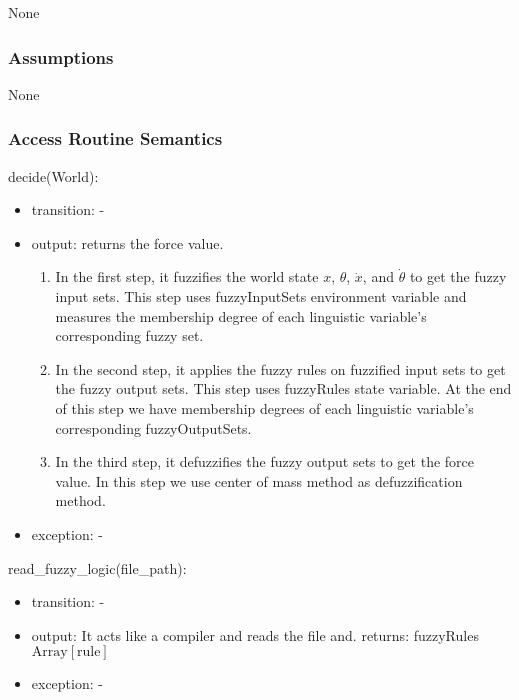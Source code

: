 \documentclass[12pt, titlepage]{article}
\begin{document}
None

\subsubsection{Assumptions}

None

\subsubsection{Access Routine Semantics}

\noindent decide(World):
\begin{itemize}
\item transition: -
\item output: returns the force value.
      \begin{enumerate}
        \item In the first step, it fuzzifies the world state $x$, $\theta$, $\dot{x}$,
        and $\dot{\theta}$ to get the fuzzy input sets. This step uses fuzzyInputSets
        environment variable and measures the membership degree of each linguistic
        variable's corresponding fuzzy set.
        \item In the second step, it applies the fuzzy rules on fuzzified input sets to
        get the fuzzy output sets. This step uses fuzzyRules state variable.
        At the end of this step we have membership degrees of each linguistic 
        variable's corresponding fuzzyOutputSets.
        \item In the third step, it defuzzifies the fuzzy output sets to get the force
        value. In this step we use center of mass method as defuzzification method.
      \end{enumerate}
\item exception: -
\end{itemize}

\noindent read\_fuzzy\_logic(file\_path):
\begin{itemize}
\item transition: -
\item output: It acts like a compiler and reads the file and. 
              returns: fuzzyRules $\text{Array}[\text{rule}]$
\item exception: -
\end{itemize}
\end{document}
